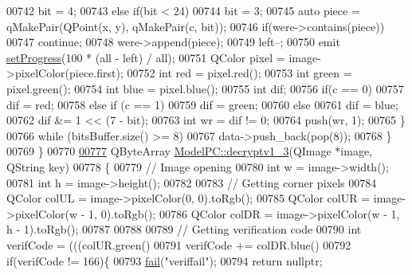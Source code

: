 \begin{DoxyCode}
00742                 bit = 4;
00743             \textcolor{keywordflow}{else} \textcolor{keywordflow}{if}(bit < 24)
00744                 bit = 3;
00745             \textcolor{keyword}{auto} piece = qMakePair(QPoint(x, y), qMakePair(c, bit));
00746             \textcolor{keywordflow}{if}(were->contains(piece))
00747                 \textcolor{keywordflow}{continue};
00748             were->append(piece);
00749             left--;
00750             emit \hyperlink{class_model_p_c_afdcd80f0ed5062e145a71f09b0897547}{setProgress}(100 * (all - left) / all);
00751             QColor pixel = image->pixelColor(piece.first);
00752             \textcolor{keywordtype}{int} red = pixel.red();
00753             \textcolor{keywordtype}{int} green = pixel.green();
00754             \textcolor{keywordtype}{int} blue = pixel.blue();
00755             \textcolor{keywordtype}{int} dif;
00756             \textcolor{keywordflow}{if}(c == 0)
00757                 dif = red;
00758             \textcolor{keywordflow}{else} \textcolor{keywordflow}{if} (c == 1)
00759                 dif = green;
00760             \textcolor{keywordflow}{else}
00761                 dif = blue;
00762             dif &= 1 << (7 - bit);
00763             \textcolor{keywordtype}{int} wr = dif != 0;
00764             push(wr, 1);
00765         \}
00766         \textcolor{keywordflow}{while} (bitsBuffer.size() >= 8)
00767             data->push\_back(pop(8));
00768     \}
00769 \}
00770 
\hypertarget{modelpc_8cpp_source.tex_l00777}{}\hyperlink{class_model_p_c_a4fe70ebbedfaf31d45a35f82d0f06caa}{00777} QByteArray \hyperlink{class_model_p_c_a4fe70ebbedfaf31d45a35f82d0f06caa}{ModelPC::decryptv1\_3}(QImage *image, QString key)
00778 \{
00779     \textcolor{comment}{// Image opening}
00780     \textcolor{keywordtype}{int} w = image->width();
00781     \textcolor{keywordtype}{int} h = image->height();
00782 
00783     \textcolor{comment}{// Getting corner pixels}
00784     QColor colUL = image->pixelColor(0, 0).toRgb();
00785     QColor colUR = image->pixelColor(w - 1, 0).toRgb();
00786     QColor colDR = image->pixelColor(w - 1, h - 1).toRgb();
00787 
00788 
00789     \textcolor{comment}{// Getting verification code}
00790     \textcolor{keywordtype}{int} verifCode = (((colUR.green() %
00791     verifCode += colDR.blue() %
00792     \textcolor{keywordflow}{if}(verifCode != 166)\{
00793         \hyperlink{class_model_p_c_a47464b59b7e37fcee25e55475708aabd}{fail}(\textcolor{stringliteral}{"veriffail"});
00794         \textcolor{keywordflow}{return} \textcolor{keyword}{nullptr};

\end{DoxyCode}
